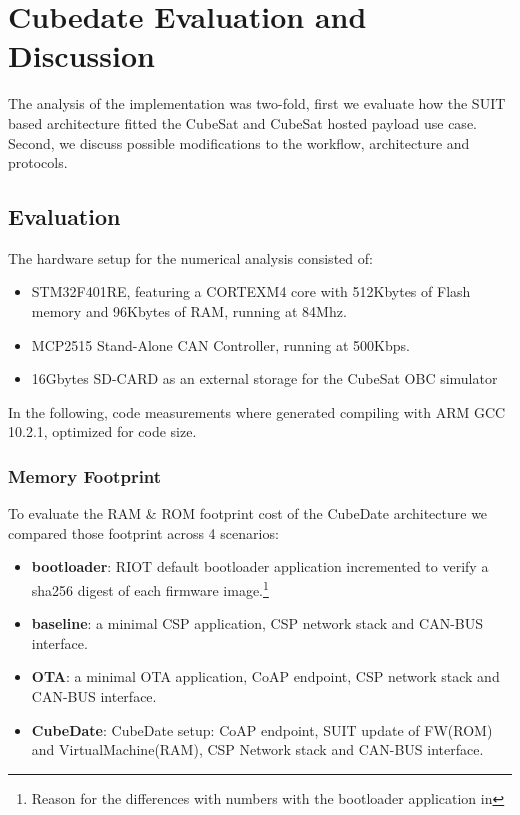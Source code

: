 \section{Cubedate Evaluation and Discussion}
\label{sec:evaluation}

The analysis of the implementation was two-fold, first we evaluate how the SUIT
based architecture fitted the CubeSat and CubeSat hosted payload use case.
Second, we discuss possible modifications to the workflow, architecture and
protocols.

\subsection{Evaluation}

The hardware setup for the numerical analysis consisted of:

\begin{itemize}
    \item STM32F401RE, featuring a CORTEX\-M4 core with 512Kbytes of Flash memory
          and 96Kbytes of RAM, running at 84Mhz.
    \item MCP2515 Stand-Alone CAN Controller, running at 500Kbps.
    \item 16Gbytes SD-CARD as an external storage for the CubeSat OBC simulator
\end{itemize}

In the following, code measurements where generated compiling with ARM GCC 10.2.1,
optimized for code size.

\subsubsection{Memory Footprint}

To evaluate the RAM \& ROM footprint cost of the CubeDate architecture we compared
those footprint across 4 scenarios:

\begin{itemize}
    \item \textbf{bootloader}: RIOT default bootloader application incremented to
    verify a sha256 digest of each firmware image.\footnote{Reason for the differences
    with numbers with the bootloader application in\cite{zandberg2019secure}}
    \item \textbf{baseline}: a minimal CSP application, CSP network stack and CAN-BUS
    interface.
    \item \textbf{OTA}: a minimal OTA application, CoAP endpoint, CSP network stack
    and CAN-BUS interface.
    \item \textbf{CubeDate}: CubeDate setup: CoAP endpoint, SUIT update of FW(ROM)
    and VirtualMachine\cite{zandberg2021femto}(RAM), CSP Network stack and CAN-BUS interface.
\end{itemize}

